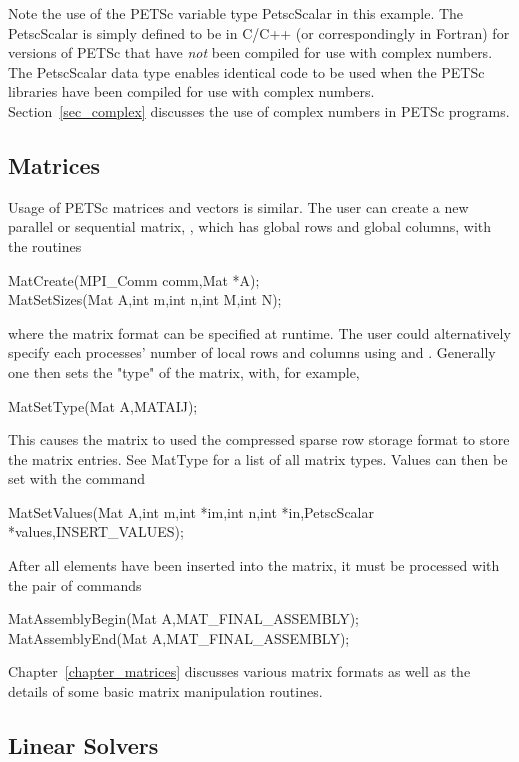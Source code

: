 Note the use of the PETSc variable type PetscScalar in this example.
The PetscScalar is simply defined to be  in C/C++
(or correspondingly   in Fortran) for versions of
PETSc that have {\em not} been compiled for use with complex numbers.
The PetscScalar data type enables
identical code to be used when the PETSc libraries have been compiled
for use with complex numbers.  Section~\ref{sec_complex} discusses the
use of complex numbers in PETSc programs.

\subsection*{Matrices}
\label{sec_matintro}

Usage of PETSc matrices and vectors is similar.  
The user can create a new parallel or sequential matrix, , which
has  global rows and  global columns, with the routines
\begin{tabbing}
  MatCreate(MPI\_Comm comm,Mat *A);\\
  MatSetSizes(Mat A,int m,int n,int M,int N);
\end{tabbing}
where the matrix format can be specified at runtime.  The user could
alternatively specify each processes' number of local rows and columns
using  and .
Generally one then sets the "type" of the matrix, with, for example,
\begin{tabbing}
  MatSetType(Mat A,MATAIJ);
\end{tabbing}
This causes the matrix to used the compressed sparse row storage format to store the
matrix entries. See MatType for a list of all matrix types.
Values can then be set with the command
\begin{tabbing}
  MatSetValues(Mat A,int m,int *im,int n,int *in,PetscScalar *values,INSERT\_VALUES);
\end{tabbing}
After  all elements have been inserted into the
matrix, it must be processed with the pair of commands
\begin{tabbing}
  MatAssemblyBegin(Mat A,MAT\_FINAL\_ASSEMBLY);\\
  MatAssemblyEnd(Mat A,MAT\_FINAL\_ASSEMBLY);
\end{tabbing}
Chapter~\ref{chapter_matrices} discusses various matrix formats as
well as the details of some basic matrix manipulation routines.

\subsection*{Linear Solvers}

